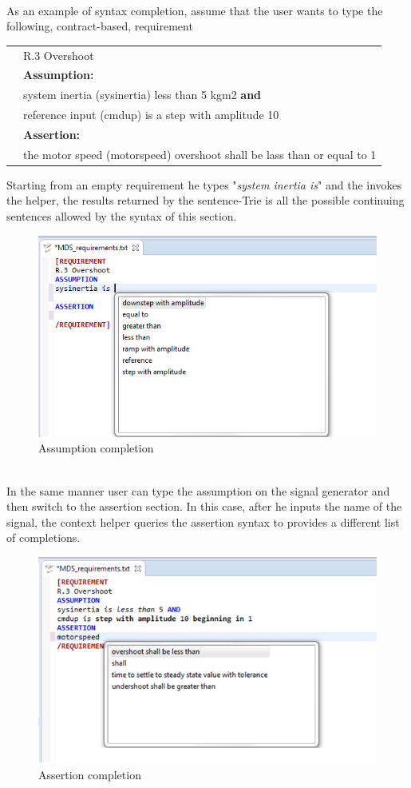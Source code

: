 \paragraph{} As an example of syntax completion, assume that the user wants to type the following, contract-based, requirement
\begin{center}
\begin{tabular}{ll}
&R.3 Overshoot \\
&\textbf{Assumption:}\\
&system inertia (sysinertia) less than 5 kgm2 \textbf{and} \\
&reference input (cmdup) is a step with amplitude 10\\
&\textbf{Assertion:}\\
&the motor speed (motorspeed) overshoot shall be lass than or equal to 1\\
\end{tabular}
\end{center}
Starting from an empty requirement he types "\textit{system inertia is}" and the invokes the helper, the results returned by the sentence-Trie is all the possible continuing sentences allowed by the syntax of this section.
\begin{figure}[h]
\centering
\includegraphics[width=.75\textwidth]{Figs/assumcompl.png}
\caption{Assumption completion}
\label{fig:assumcompl}
\end{figure}
\noindent
\\
In the same manner user can type the assumption on the signal generator and then switch to the assertion section.
In this case, after he inputs the name of the signal, the context helper queries the assertion syntax to provides a different list of completions.
\begin{figure}[h]
\centering
\includegraphics[width=.8\textwidth]{Figs/assercompl.png}
\caption{Assertion completion}
\label{fig:assercompl}
\end{figure}

